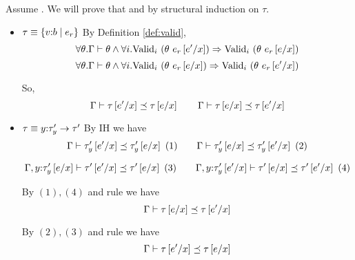 Assume .
We will prove that 
and
by structural induction on $\tau$.

\begin{itemize}
\item $\tau\equiv \tref{v}{b}{e_r}$
By Definition \ref{def:valid}, 
$$\forall \theta. \iswellformed{\Gamma}{\theta} \land 
	\generalconditionImpl{\theta\ e_r\sub{x}{e'}}{\theta\ e_r\sub{x}{e}}
$$
$$
\forall \theta. \iswellformed{\Gamma}{\theta} \land 
	\generalconditionImpl{\theta\ e_r\sub{x}{e}}{\theta\ e_r\sub{x}{e'}}$$

So, 
$$\issubtype{\Gamma}{\tau\sub{x}{e'}}{\tau\sub{x}{e}}
\qquad
\issubtype{\Gamma}{\tau\sub{x}{e}}{\tau\sub{x}{e'}}
$$	
\item $\tau\equiv \tfun{y}{\tau'_y}{\tau'}$
By IH we have
$$
\issubtype{\Gamma}{\tau'_y\sub{x}{e'}}{\tau'_y\sub{x}{e}}\ (1)
\qquad
\issubtype{\Gamma}{\tau'_y\sub{x}{e}}{\tau'_y\sub{x}{e'}}\ (2)
$$

$$
\issubtype{\Gamma, y\colon\tau'_y\sub{x}{e}}{\tau'\sub{x}{e'}}{\tau'\sub{x}{e}}\ (3)
\qquad
\issubtype{\Gamma, y\colon\tau'_y\sub{x}{e'}}{\tau'\sub{x}{e}}{\tau'\sub{x}{e'}}\ (4)
$$

By $(1), (4)$ and rule \rtsub we have
$$\issubtype{\Gamma}{\tau\sub{x}{e}}{\tau\sub{x}{e'}}$$

By $(2), (3)$ and rule \rtsub we have
$$\issubtype{\Gamma}{\tau\sub{x}{e'}}{\tau\sub{x}{e}}$$
\end{itemize}
